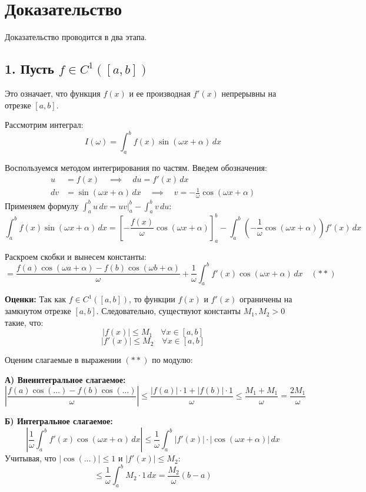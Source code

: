 \documentclass[12pt,a4paper,openany]{book}
\begin{document}
\section{Доказательство}

Доказательство проводится в два этапа.

\subsection*{1. Пусть $f \in C^1([a, b])$}
Это означает, что функция $f(x)$ и ее производная $f'(x)$ непрерывны на отрезке $[a, b]$.

Рассмотрим интеграл:
$$ I(\omega) = \int_a^b f(x) \sin(\omega x + \alpha) \, dx $$

Воспользуемся методом интегрирования по частям. Введем обозначения:
\begin{align*}
    u &= f(x) \quad \implies \quad du = f'(x) \, dx \\
    dv &= \sin(\omega x + \alpha) \, dx \quad \implies \quad v = -\frac{1}{\omega} \cos(\omega x + \alpha)
\end{align*}
Применяем формулу $\int_a^b u \, dv = uv \big|_a^b - \int_a^b v \, du$:
$$ \int_a^b f(x) \sin(\omega x + \alpha) \, dx = \left[ -\frac{f(x)}{\omega} \cos(\omega x + \alpha) \right]_a^b - \int_a^b \left( -\frac{1}{\omega} \cos(\omega x + \alpha) \right) f'(x) \, dx $$

Раскроем скобки и вынесем константы:
$$ = \frac{f(a)\cos(\omega a + \alpha) - f(b)\cos(\omega b + \alpha)}{\omega} + \frac{1}{\omega} \int_a^b f'(x) \cos(\omega x + \alpha) \, dx \quad (**)$$

\textbf{Оценки:}
Так как $f \in C^1([a, b])$, то функции $f(x)$ и $f'(x)$ ограничены на замкнутом отрезке $[a, b]$. Следовательно, существуют константы $M_1, M_2 > 0$ такие, что:
$$ |f(x)| \le M_1 \quad \forall x \in [a, b] $$
$$ |f'(x)| \le M_2 \quad \forall x \in [a, b] $$

Оценим слагаемые в выражении $(**)$ по модулю:

\textbf{А) Внеинтегральное слагаемое:}
$$ \left| \frac{f(a)\cos(\dots) - f(b)\cos(\dots)}{\omega} \right| \le \frac{|f(a)| \cdot 1 + |f(b)| \cdot 1}{\omega} \le \frac{M_1 + M_1}{\omega} = \frac{2M_1}{\omega} $$

\textbf{Б) Интегральное слагаемое:}
$$ \left| \frac{1}{\omega} \int_a^b f'(x) \cos(\omega x + \alpha) \, dx \right| \le \frac{1}{\omega} \int_a^b |f'(x)| \cdot |\cos(\omega x + \alpha)| \, dx $$
Учитывая, что $|\cos(\dots)| \le 1$ и $|f'(x)| \le M_2$:
$$ \le \frac{1}{\omega} \int_a^b M_2 \cdot 1 \, dx = \frac{M_2}{\omega} (b - a) $$
\end{document}
